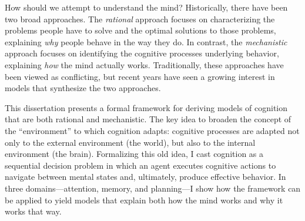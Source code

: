 
How should we attempt to understand the mind? Historically, there have been two broad approaches. The \emph{rational} approach focuses on characterizing the problems people have to solve and the optimal solutions to those problems, explaining \emph{why} people behave in the way they do. In contrast, the \emph{mechanistic} approach focuses on identifying the cognitive processes underlying behavior, explaining \emph{how} the mind actually works. Traditionally, these approaches have been viewed as conflicting, but recent years have seen a growing interest in models that synthesize the two approaches.

This dissertation presents a formal framework for deriving models of cognition that are both rational and mechanistic. The key idea to broaden the concept of the ``environment'' to which cognition adapts: cognitive processes are adapted not only to the external environment (the world), but also to the internal environment (the brain). Formalizing this old idea, I cast cognition as a sequential decision problem in which an agent executes cognitive actions to navigate between mental states and, ultimately, produce effective behavior. In three domains---attention, memory, and planning---I show how the framework can be applied to yield models that explain both how the mind works and why it works that way.




